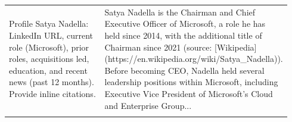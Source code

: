 \begin{longtable}{p{0.46\linewidth} p{0.48\linewidth}}
\addlinespace
Profile Satya Nadella: LinkedIn URL, current role (Microsoft), prior roles, acquisitions led, education, and recent news (past 12 months). Provide inline citations. & Satya Nadella is the Chairman and Chief Executive Officer of Microsoft, a role he has held since 2014, with the additional title of Chairman since 2021 (source: [Wikipedia](https://en.wikipedia.org/wiki/Satya_Nadella)). Before becoming CEO, Nadella held several leadership positions within Microsoft, including Executive Vice President of Microsoft's Cloud and Enterprise Group... \\
\addlinespace
\bottomrule
\end{longtable}

